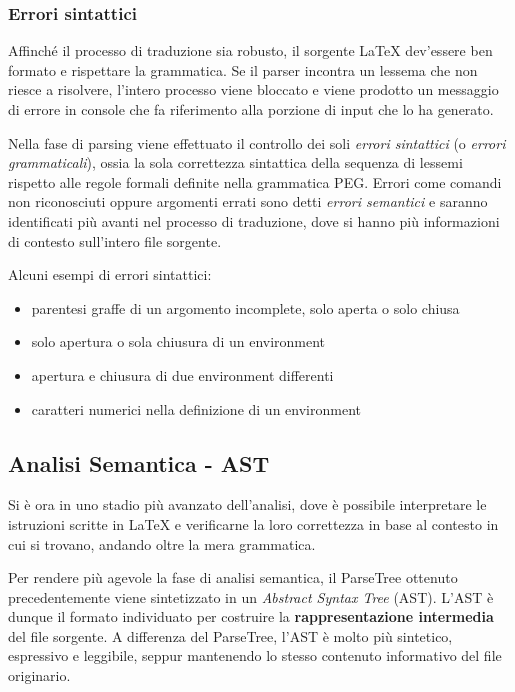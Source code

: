 \documentclass{article}
\begin{document}
    \subsubsection{Errori sintattici}
    Affinché il processo di traduzione sia robusto, il sorgente LaTeX dev'essere ben formato e rispettare la grammatica.
    Se il parser incontra un lessema che non riesce a risolvere, l'intero processo viene bloccato e viene prodotto un messaggio di errore in console che fa riferimento alla porzione di input che lo ha generato.

    Nella fase di parsing viene effettuato il controllo dei soli \textit{errori sintattici} (o \textit{errori grammaticali}), ossia la sola correttezza sintattica della sequenza di lessemi rispetto alle regole formali definite nella grammatica PEG.
    Errori come comandi non riconosciuti oppure argomenti errati sono detti \textit{errori semantici} e saranno identificati più avanti nel processo di traduzione, dove si hanno più informazioni di contesto sull'intero file sorgente.

    Alcuni esempi di errori sintattici:
    \begin{itemize}
        \item parentesi graffe di un argomento incomplete, solo aperta o solo chiusa
        \item solo apertura o sola chiusura di un environment
        \item apertura e chiusura di due environment differenti
        \item caratteri numerici nella definizione di un environment
    \end{itemize}

    \subsection{Analisi Semantica - AST}
    Si è ora in uno stadio più avanzato dell'analisi, dove è possibile interpretare le istruzioni scritte in LaTeX e verificarne la loro correttezza in base al contesto in cui si trovano, andando oltre la mera grammatica.

    Per rendere più agevole la fase di analisi semantica, il ParseTree ottenuto precedentemente viene sintetizzato in un \textit{Abstract Syntax Tree} (AST).
    L'AST è dunque il formato individuato per costruire la \textbf{rappresentazione intermedia} del file sorgente.
    A differenza del ParseTree, l'AST è molto più sintetico, espressivo e leggibile, seppur mantenendo lo stesso contenuto informativo del file originario.
\end{document}
